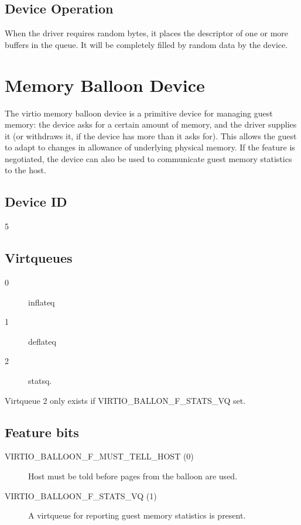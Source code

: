 \subsection{Device Operation}\label{sec:Device Types / Entropy Device / Device Operation}

When the driver requires random bytes, it places the descriptor
of one or more buffers in the queue. It will be completely filled
by random data by the device.

\section{Memory Balloon Device}\label{sec:Device Types / Memory Balloon Device}

The virtio memory balloon device is a primitive device for
managing guest memory: the device asks for a certain amount of
memory, and the driver supplies it (or withdraws it, if the device
has more than it asks for). This allows the guest to adapt to
changes in allowance of underlying physical memory. If the
feature is negotiated, the device can also be used to communicate
guest memory statistics to the host.

\subsection{Device ID}\label{sec:Device Types / Memory Balloon Device / Device ID}
  5

\subsection{Virtqueues}\label{sec:Device Types / Memory Balloon Device / Virtqueues}
\begin{description}
\item[0] inflateq
\item[1] deflateq
\item[2] statsq.
\end{description}

  Virtqueue 2 only exists if VIRTIO_BALLON_F_STATS_VQ set.

\subsection{Feature bits}\label{sec:Device Types / Memory Balloon Device / Feature bits}
\begin{description}
\item[VIRTIO_BALLOON_F_MUST_TELL_HOST (0)] Host must be told before
    pages from the balloon are used.

\item[VIRTIO_BALLOON_F_STATS_VQ (1)] A virtqueue for reporting guest
    memory statistics is present.
\end{description}

